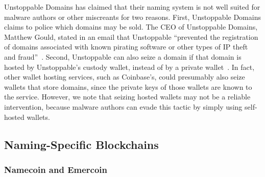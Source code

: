 Unstoppable Domains has claimed that their naming system is not well suited for 
malware authors or other miscreants for two reasons. First, Unstoppable Domains 
claims to police which domains may be sold. The CEO of Unstoppable Domains, 
Matthew Gould, stated in an email that Unstoppable ``prevented the 
registration of domains associated with known pirating software or other types 
of IP theft and fraud''~\cite{pegoraro_blockchain_2021}. Second, Unstoppable 
can also seize a domain if that 
domain is hosted by Unstoppable's custody 
wallet, instead of by a private wallet~\cite{pegoraro_blockchain_2021}. In 
fact, other wallet hosting 
services, such as Coinbase's, 
could presumably also seize wallets that store domains, since the private 
keys of those wallets are 
known to the service. However, we note that seizing hosted wallets may not 
be a reliable 
intervention, because malware authors can evade this tactic by simply using 
self-hosted wallets. 

\subsection{Naming-Specific Blockchains}
\subsubsection{Namecoin and Emercoin}
